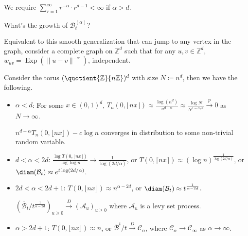 \begin{note}
	We require \(\sum_{r=1}^{\infty} r^{-\alpha } \cdot r^{d - 1} < \infty \) if \(\alpha > d\).
\end{note}

\begin{problem*}
	What's the growth of \(\mathcal{B} ^{(\alpha )}_t\)?
\end{problem*}

Equivalent to this smooth generalization that can jump to any vertex in the graph, consider a complete graph on \(\mathbb{Z} ^d\) such that for any \(u, v \in \mathbb{Z} ^d\), \(w_{uv} = \operatorname{Exp}(\lVert u - v \rVert ^{-\alpha }) \), independent.

\begin{theorem}
	Consider the torus \((\quotient{\mathbb{Z} }{n \mathbb{Z} } )^d\) with size \(N \coloneqq n^d\), then we have the following.
	\begin{itemize}
		\item \(\alpha < d\): For some \(x \in (0, 1)^d\), \(T_n(0, \lfloor n x \rfloor ) \approx \frac{\log (n^d)}{n^{d - \alpha }} \approx \frac{\log N}{N^{1 - \alpha / d} } \overset{p}{\to} 0\) as \(N \to \infty \).

		      \begin{conjecture}
			      \(n^{d - \alpha } T_n(0, \lfloor n x \rfloor ) - c \log n \) converges in distribution to some non-trivial random variable.
		      \end{conjecture}
		\item \(d < \alpha < 2d\): \(\frac{\log T(0, \lfloor n x \rfloor )}{\log \log n} \to \frac{1}{\log (2d / \alpha )}\), or \(T(0, \lceil n x \rceil ) \approx (\log n)^{\frac{1}{\log (2d / \alpha )}}\), or \(\diam(\mathcal{B} _t) \approx e^{t \log (2d / \alpha )}\).
		\item \(2d < \alpha < 2d + 1\): \(T(0, \lfloor n x \rfloor ) \approx n^{\alpha - 2d}\), or \(\diam (\mathcal{B} _t) \approx t^{\frac{1}{\alpha - 2d}}\).
		      \begin{conjecture}
			      \((\overline{\mathcal{B} }_t / t^{\frac{1}{\alpha - 2d}} )_{u \geq 0} \overset{D}{\to} (\mathcal{A} _u)_{u \geq 0}\) where \(\mathcal{A} _u\) is a levy set process.
		      \end{conjecture}
		\item \(\alpha > 2d + 1\): \(T(0, \lfloor n x \rfloor ) \approx n\), or \(\overline{\mathcal{B} }^t / t \overset{D}{\to} \mathcal{C} _\alpha \), where \(\mathcal{C} _\alpha \to \mathcal{C} _\infty \) as \(\alpha \to \infty \).
	\end{itemize}
\end{theorem}

